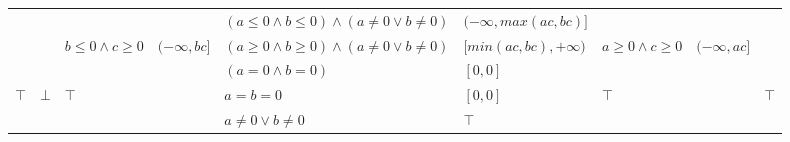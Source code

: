 \documentclass{beamer}
\begin{document}
\begin{frame}
\begin{table}[]
{\begin{tabular}{|l|l|ll|ll|ll|ll|}
                                        &                         &                                                        &                                  & $(a \le 0 \land b \le 0) \land (a \ne 0 \lor b \ne 0)$  & $(-\infty, max(ac, bc)]$ &                                                        &                                  & \multicolumn{2}{l|}{}                                               \\
                                        &                         & \multirow{2}{*}{$b \le 0 \land c \ge 0$}               & \multirow{2}{*}{$(-\infty, bc]$} & $(a \ge 0 \land b \ge 0) \land (a \ne 0 \lor b \ne 0)$  & $[min(ac, bc), +\infty)$ & \multirow{2}{*}{$a \ge 0 \land c \ge 0$}               & \multirow{2}{*}{$(-\infty, ac]$} & \multicolumn{2}{l|}{}                                               \\
                                        &                         &                                                        &                                  & $(a = 0 \land b = 0)$                                   & $[0, 0]$                 &                                                        &                                  & \multicolumn{2}{l|}{}                                               \\ \hline
        \multirow{2}{*}{$\top$}         & \multirow{2}{*}{$\bot$} & \multicolumn{2}{l|}{\multirow{2}{*}{$\top$}}                                              & $a = b = 0$                                             & $[0, 0]$                 & \multicolumn{2}{l|}{\multirow{2}{*}{$\top$}}                                              & \multicolumn{2}{l|}{\multirow{2}{*}{$\top$}}                        \\
                                        &                         & \multicolumn{2}{l|}{}                                                                     & $a \ne 0 \lor b \ne 0$                                  & $\top$                   & \multicolumn{2}{l|}{}                                                                     & \multicolumn{2}{l|}{}                                               \\ \hline
        \end{tabular}}
        \end{table}
    \end{frame}
    
\end{document}
